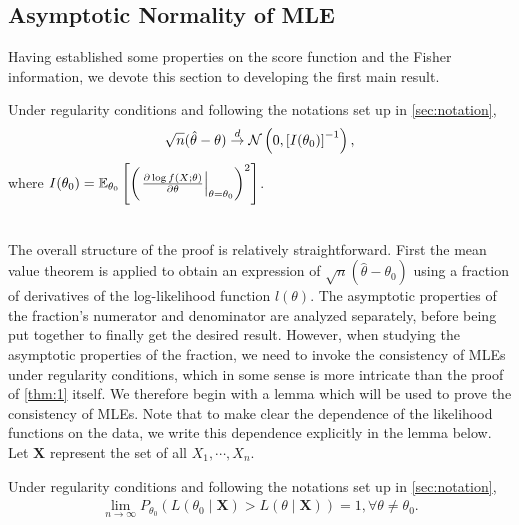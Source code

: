 \subsection{Asymptotic Normality of MLE}
Having established some properties on the score function and the Fisher information, we devote this section to developing the first main result.
\begin{theorem} \label{thm:1}
Under regularity conditions and following the notations set up in \cref{sec:notation}, 
\begin{align*}
\sqrt{n}(\hat{\theta} - \theta) \overset{d}{\rightarrow} \mathcal{N}\left(0, \left[ I(\theta_0) \right]^{-1}\right),
\end{align*}
where $I(\theta_0) = \mathbb{E}_{\theta_0}\left[ \left( \left.\frac{\partial \log f(X;\theta)}{\partial\theta}\right\vert_{\theta=\theta_0} \right)^2 \right]$.
\end{theorem}
$ $\\
The overall structure of the proof is relatively straightforward. First the mean value theorem is applied to obtain an expression of $\sqrt{n}(\hat{\theta} - \theta_0)$ using a fraction of derivatives of the log-likelihood function $l(\theta)$. The asymptotic properties of the fraction's numerator and denominator are analyzed separately, before being put together to finally get the desired result. However, when studying the asymptotic properties of the fraction, we need to invoke the consistency of MLEs under regularity conditions, which in some sense is more intricate than the proof of \cref{thm:1} itself. We therefore begin with a lemma which will be used to prove the consistency of MLEs. Note that to make clear the dependence of the likelihood functions on the data, we write this dependence explicitly in the lemma below. Let $\bm{X}$ represent the set of all \iid $X_1,\cdots,X_n$.
\begin{lemma} \label{lem:1}
Under regularity conditions and following the notations set up in \cref{sec:notation},
\begin{align*}
\lim_{n\to\infty} P_{\theta_0}\left( L(\theta_0 \mid \bm{X}) > L(\theta \mid \bm{X}) \right) = 1, \forall \theta \neq \theta_0.
\end{align*}
\end{lemma}
